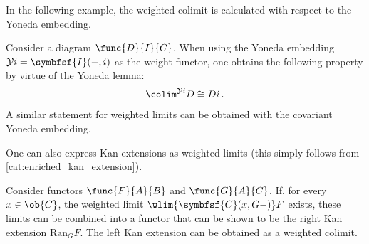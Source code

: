     In the following example, the weighted colimit is calculated with respect to the Yoneda embedding.
    \begin{example}
        Consider a diagram $\func{D}{I}{C}$. When using the Yoneda embedding $\mathcal{Y}i = \symbfsf{I}(-,i)$ as the weight functor, one obtains the following property by virtue of the Yoneda lemma:
        \begin{gather}
            \label{cat:weighted_hom_colimit}
            \colim^{\mathcal{Y}i}D\cong Di\,.
        \end{gather}
        A similar statement for weighted limits can be obtained with the covariant Yoneda embedding.
    \end{example}

    One can also express Kan extensions as weighted limits (this simply follows from \cref{cat:enriched_kan_extension}).
    \begin{property}
        Consider functors $\func{F}{A}{B}$ and $\func{G}{A}{C}$. If, for every $x\in\ob{C}$, the weighted limit $\wlim{\symbfsf{C}(x,G-)}F$ exists, these limits can be combined into a functor that can be shown to be the right Kan extension $\mathrm{Ran}_GF$. The left Kan extension can be obtained as a weighted colimit.
    \end{property}


